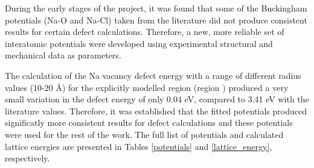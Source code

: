 \documentclass[12pt]{report}
\newcommand{\RomanNumeralCaps}[1]
    {\MakeUppercase{\romannumeral #1}}
\begin{document}
During the early stages of the project, it was found that some of the Buckingham potentials (Na-O and Na-Cl) taken from the literature did not produce consistent results for certain defect calculations.
Therefore, a new, more reliable set of interatomic potentials were developed using experimental structural and mechanical data as parameters.

The calculation of the Na vacancy defect energy with a range of different radius values (10-20 \AA) for the explicitly modelled region (region \RomanNumeralCaps{1}) produced a very small variation in the defect energy of only 0.04 eV, compared to 3.41 eV with the literature values.
Therefore, it was established that the fitted potentials produced significatly more consistent results for defect calculations and these potentials were used for the rest of the work.
The full list of potentials and calculated lattice energies are presented in Tables \ref{potentials} and \ref{lattice_energy}, respectively.
\end{document}
